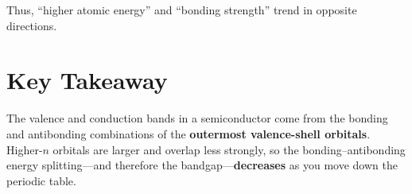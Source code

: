 \documentclass[12pt]{article}
\begin{document}
	Thus, ``higher atomic energy'' and ``bonding strength'' trend in opposite directions.
	
	\section{Key Takeaway}
	The valence and conduction bands in a semiconductor come from the bonding and antibonding combinations of the \textbf{outermost valence-shell orbitals}. Higher-$n$ orbitals are larger and overlap less strongly, so the bonding--antibonding energy splitting---and therefore the bandgap---\textbf{decreases} as you move down the periodic table.
	
\end{document}
